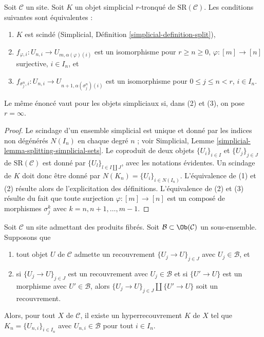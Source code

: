 \begin{lemma}
\label{lemma-split}
Soit $\mathcal{C}$ un site. Soit $K$ un objet simplicial $r$-tronqué
de $\text{SR}(\mathcal{C})$. Les conditions suivantes sont équivalentes :
\begin{enumerate}
\item $K$ est scindé (Simplicial, Définition \ref{simplicial-definition-split}),
\item $f_{\varphi, i} : U_{n, i} \to U_{m, \alpha(\varphi)(i)}$
est un isomorphisme pour $r \geq n \geq 0$,
$\varphi : [m] \to [n]$ surjective, $i \in I_n$, et
\item $f_{\sigma^n_j, i} : U_{n, i} \to U_{n + 1, \alpha(\sigma^n_j)(i)}$
est un isomorphisme pour $0 \leq j \leq n < r$, $i \in I_n$.
\end{enumerate}
Le même énoncé vaut pour les objets simpliciaux si, dans (2) et (3),
on pose $r = \infty$.
\end{lemma}

\begin{proof}
Le scindage d'un ensemble simplicial est unique et donné par
les indices non dégénérés $N(I_n)$ en chaque degré $n$ ; voir
Simplicial, Lemme \ref{simplicial-lemma-splitting-simplicial-sets}.
Le coproduit de deux objets $\{U_i\}_{i \in I}$ et $\{U_j\}_{j \in J}$
de $\text{SR}(\mathcal{C})$ est donné par $\{U_l\}_{l \in I \amalg J}$,
avec les notations évidentes. Un scindage de $K$ doit donc être donné par
$N(K_n) = \{U_i\}_{i \in N(I_n)}$. L'équivalence de (1) et (2)
résulte alors de l'explicitation des définitions. L'équivalence de (2)
et (3) résulte du fait que toute surjection
$\varphi : [m] \to [n]$ est un composé de morphismes
$\sigma^k_j$ avec $k = n, n + 1, \ldots, m - 1$.
\end{proof}

\begin{lemma}
\label{lemma-hypercovering-object}
Soit $\mathcal{C}$ un site admettant des produits fibrés.
Soit $\mathcal{B} \subset \Ob(\mathcal{C})$ un sous-ensemble.
Supposons que
\begin{enumerate}
\item tout objet $U$ de $\mathcal{C}$ admette un recouvrement
$\{U_j \to U\}_{j \in J}$ avec $U_j \in \mathcal{B}$, et
\item si $\{U_j \to U\}_{j \in J}$ est un recouvrement
avec $U_j \in \mathcal{B}$ et si $\{U' \to U\}$ est un morphisme avec
$U' \in \mathcal{B}$, alors $\{U_j \to U\}_{j \in J} \amalg \{U' \to U\}$
soit un recouvrement.
\end{enumerate}
Alors, pour tout $X$ de $\mathcal{C}$, il existe un hyperrecouvrement $K$
de $X$ tel que $K_n = \{U_{n, i}\}_{i \in I_n}$
avec $U_{n, i} \in \mathcal{B}$ pour tout $i \in I_n$.
\end{lemma}

